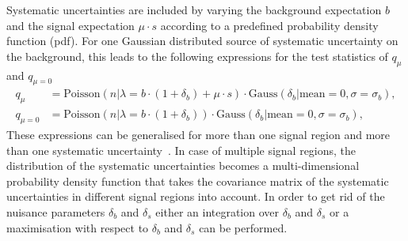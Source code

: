 Systematic uncertainties are included by varying the background expectation $b$ and the signal expectation $\mu\cdot s$ according to a predefined probability density function (pdf).
For one Gaussian distributed source of systematic uncertainty on the background, this leads to the following expressions for the test statistics of $q_{\mu}$ and $q_{\mu=0}$
\begin{equation}
\label{eq:CLsb_CLb_withSys}
\begin{split}
q_{\mu}    &= \text{Poisson}\left( n |\lambda = b \cdot (1+\delta_b)+\mu\cdot s   \right) \cdot \text{Gauss}\left(\delta_b|\text{mean}=0, \sigma = \sigma_b\right),\\
q_{\mu=0}  &=  \text{Poisson}\left( n |\lambda = b \cdot (1+\delta_b)   \right) \cdot \text{Gauss}\left(\delta_b|\text{mean}=0, \sigma = \sigma_b\right),
\end{split}
\end{equation}
These expressions can be generalised for more than one signal region and more than one systematic uncertainty~\cite{bib:Ott_Thesis}.
In case of multiple signal regions, the distribution of the systematic uncertainties becomes a multi-dimensional probability density function that takes the covariance matrix of the systematic uncertainties in different signal regions into account.
In order to get rid of the nuisance parameters $\delta_b$ and $\delta_s$ either an integration over $\delta_b$ and $\delta_s$ or a maximisation with respect to $\delta_b$ and $\delta_s$ can be performed.

